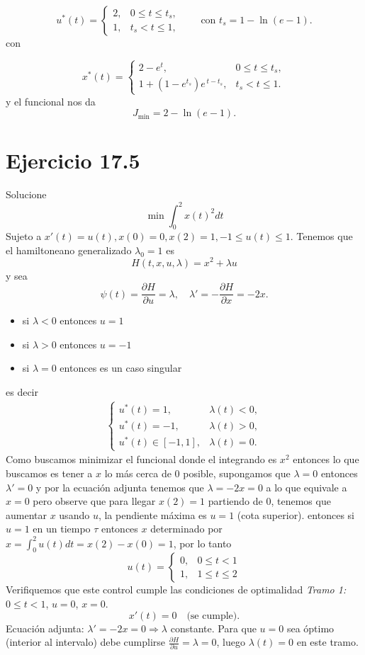 \documentclass{uofa-eng-assignment}
\newcommand{\la}{\lambda}
\begin{document}
\[
u^*(t)=
\begin{cases}
2, & 0 \le t \le t_s,\\[4pt]
1, & t_s < t \le 1,
\end{cases}
\qquad
\text{con } t_s = 1-\ln(e-1).
\]
con
    
\[
x^*(t)=
\begin{cases}
2-e^t, & 0 \le t \le t_s,\\[4pt]
1+\left(1-e^{t_s}\right)e^{\,t-t_s},
& t_s < t \le 1.
\end{cases}
\]
y el funcional nos da
\[
J_{\min}=2-\ln(e-1).
\]
\section*{Ejercicio 17.5}
Solucione 
\[
 \min \int_0^2 x(t)^2 dt
\]
Sujeto a $x'(t)=u(t), x(0)=0,x(2)=1, -1\leq u(t)\leq 1$.
Tenemos que el hamiltoneano generalizado $\lambda_0=1$ es 
\[
H(t,x,u,\lambda)= x^2+\la u
\]
y sea 
\[
\psi(t) = \frac{\partial H}{\partial u} = \lambda , \quad  \la' = -\frac{\partial H}{\partial x}  =-2x.
\]
\begin{itemize}
    \item si $\la <0$ entonces $u=1$
    \item si $\lambda >0$ entonces $u=-1$
    \item si $\lambda =0$ entonces es un caso singular
\end{itemize}
es decir 
\begin{align}
    \begin{cases}
u^*(t) = 1, & \lambda(t) < 0,\\[4pt]
u^*(t) = -1, & \lambda(t) > 0,\\[4pt]
u^*(t) \in [-1,1], & \lambda(t) = 0.
    \end{cases}
\end{align}
Como buscamos minimizar el funcional donde el integrando es $x^2$ entonces lo que buscamos es
tener a $x$ lo más cerca de $0$ posible, supongamos que $\la = 0$ entonces $\la' = 0$ y por la ecuación
adjunta tenemos que $\la = -2x = 0$ a lo que equivale a $x=0$ pero observe que para llegar $x(2)=1$  partiendo de $0$, tenemos que aumentar 
$x$ usando $u$, la pendiente máxima es $u=1$ (cota superior).
entonces si $u=1$ en un tiempo $\tau$ entonces $x$ determinado por $x=\int _0^2 u(t)dt=x(2)-x(0)=1$, por lo tanto
\[
u(t) = \begin{cases}
    0, & 0\leq t <1\\
    1, & 1\leq t \leq 2
\end{cases}
\]
Verifiquemos que este control cumple las condiciones de optimalidad 
\textit{Tramo 1:} $0 \le t < 1$, $u=0$, $x=0$.
\[
x'(t)=0 \quad \text{(se cumple)}.
\]
Ecuación adjunta: $\lambda' = -2x = 0 \Rightarrow \lambda$ constante. 
Para que $u=0$ sea óptimo (interior al intervalo) debe cumplirse $\frac{\partial H}{\partial u} = \lambda = 0$, luego $\lambda(t)=0$ en este tramo.
\end{document}
